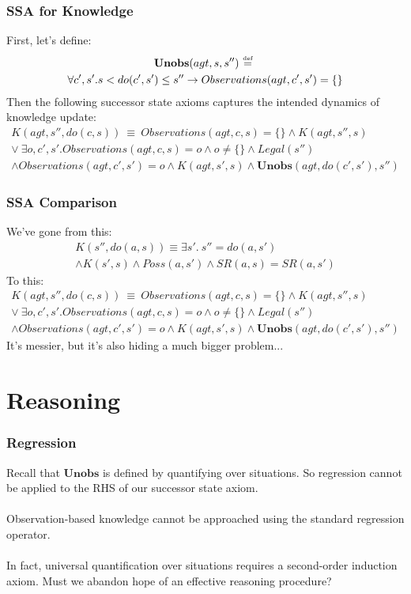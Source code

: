 \documentclass{beamer}
\newcommand{\isdef}{\hbox{$\stackrel{\mbox{\tiny def}}{=}$}}
\begin{document}
\begin{frame}
\frametitle{SSA for Knowledge}
First, let's define:
\begin{multline*}
  \mathbf{Unobs}(agt,s,s'')\ \isdef\ \\
    \forall c',s' . s < do(c',s') \leq s'' \rightarrow Observations(agt,c',s') = \{\}
\end{multline*}
\pause
Then the following successor state axioms captures the intended dynamics of
knowledge update:
\begin{multline*}
  K(agt,s'',do(c,s))\ \equiv\ Observations(agt,c,s) = \{\} \wedge K(agt,s'',s)\\
  \vee\ \exists o,c',s'.Observations(agt,c,s) = o \wedge o  \neq \{\} \wedge Legal(s'') \\
  \wedge Observations(agt,c',s')= o \wedge K(agt,s',s) \wedge \mathbf{Unobs}(agt,do(c',s'),s'')
\end{multline*}
\end{frame}

\begin{frame}
\frametitle{SSA Comparison}
We've gone from this:
\begin{multline*}
 K(s'',do(a,s)) \equiv \exists s' . \ s''=do(a,s') \\
 \wedge K(s',s) \wedge Poss(a,s') \wedge SR(a,s) = SR(a,s')
\end{multline*}
\pause
To this:
\begin{multline*}
  K(agt,s'',do(c,s))\ \equiv\ Observations(agt,c,s) = \{\} \wedge K(agt,s'',s)\\
  \vee\ \exists o,c',s'.Observations(agt,c,s) = o \wedge o  \neq \{\} \wedge Legal(s'') \\
  \wedge Observations(agt,c',s')= o \wedge K(agt,s',s) \wedge \mathbf{Unobs}(agt,do(c',s'),s'')
\end{multline*}
\pause
It's messier, but it's also hiding a much bigger problem...
\end{frame}

\section{Reasoning}

\begin{frame}
\frametitle{Regression}
Recall that $\mathbf{Unobs}$ is defined by quantifying over situations.
So regression cannot be applied to the RHS of our successor state axiom.
\ \\
\ \\
Observation-based knowledge \alert{cannot} be approached using
the standard regression operator.
\ \\
\ \\
\pause
In fact, universal quantification over situations requires a
second-order induction axiom.
Must we abandon hope of an effective reasoning procedure?
\end{frame}
\end{document}

